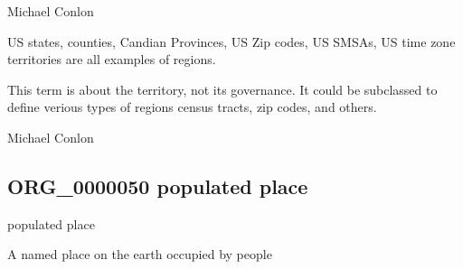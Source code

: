 \documentclass[letterpaper,10pt,english]{sphinxmanual}
\begin{document}
\begin{sphinxShadowBox}

\sphinxAtStartPar
Michael Conlon 
\end{sphinxShadowBox}

\begin{sphinxShadowBox}

\sphinxAtStartPar
US states, counties, Candian Provinces, US Zip codes, US SMSAs, US time zone territories are all examples of regions.
\end{sphinxShadowBox}

\begin{sphinxShadowBox}

\sphinxAtStartPar
This term is about the territory, not its governance.  It could be subclassed to define verious types of regions \textendash{} census tracts, zip codes, and others.
\end{sphinxShadowBox}

\begin{sphinxShadowBox}

\sphinxAtStartPar
Michael Conlon 
\end{sphinxShadowBox}
\begin{quote}

\ignorespaces \end{quote}


\subsection{ORG\_0000050 \sphinxhyphen{} populated place}
\label{\detokenize{doc-ORG_0000050:org-0000050-populated-place}}\label{\detokenize{doc-ORG_0000050:index-0}}\label{\detokenize{doc-ORG_0000050::doc}}
\begin{sphinxShadowBox}

\sphinxAtStartPar
populated place
\end{sphinxShadowBox}

\begin{sphinxShadowBox}

\sphinxAtStartPar
A named place on the earth occupied by people
\end{sphinxShadowBox}
\end{document}
